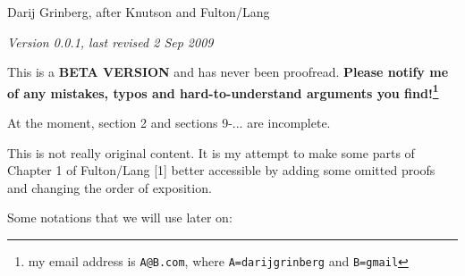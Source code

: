 \documentclass[12pt,final,notitlepage,onecolumn,german]{article}%
\begin{document}
\begin{center}

Darij Grinberg, after Knutson and Fulton/Lang

\textit{Version 0.0.1, last revised 2 Sep 2009}
\end{center}

This is a \textbf{BETA VERSION} and has never been proofread. \textbf{Please
notify me of any mistakes, typos and hard-to-understand arguments you
find!\footnote{my email address is \texttt{A@B.com}, where
\texttt{A=darijgrinberg} and \texttt{B=gmail}}}

At the moment, section 2 and sections 9-... are incomplete.

\bigskip


This is not really original content. It is my attempt to make some parts of
Chapter 1 of Fulton/Lang [1] better accessible by adding some omitted proofs
and changing the order of exposition.

\begin{center}
\end{center}

Some notations that we will use later on:
\end{document}
